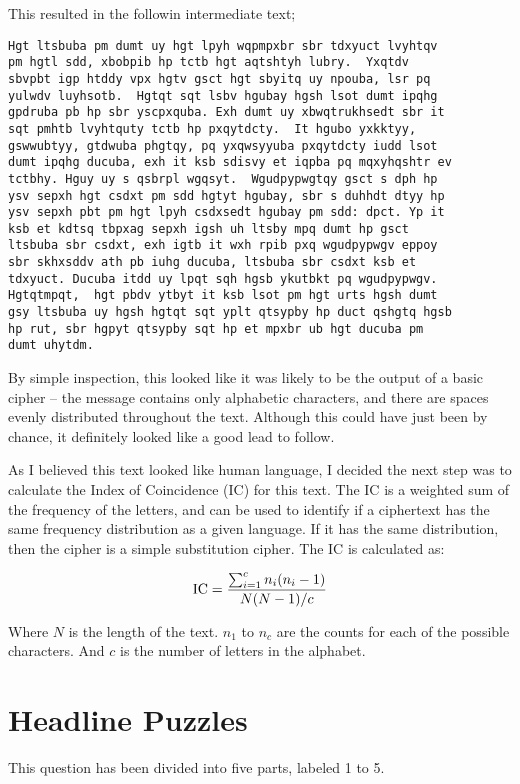 \documentclass[12pt,a4paper,twoside]{article}
\begin{document}
This resulted in the followin intermediate text; 

\begin{lstlisting}
Hgt ltsbuba pm dumt uy hgt lpyh wqpmpxbr sbr tdxyuct lvyhtqv
pm hgtl sdd, xbobpib hp tctb hgt aqtshtyh lubry.  Yxqtdv
sbvpbt igp htddy vpx hgtv gsct hgt sbyitq uy npouba, lsr pq
yulwdv luyhsotb.  Hgtqt sqt lsbv hgubay hgsh lsot dumt ipqhg
gpdruba pb hp sbr yscpxquba. Exh dumt uy xbwqtrukhsedt sbr it
sqt pmhtb lvyhtquty tctb hp pxqytdcty.  It hgubo yxkktyy,
gswwubtyy, gtdwuba phgtqy, pq yxqwsyyuba pxqytdcty iudd lsot
dumt ipqhg ducuba, exh it ksb sdisvy et iqpba pq mqxyhqshtr ev
tctbhy. Hguy uy s qsbrpl wgqsyt.  Wgudpypwgtqy gsct s dph hp
ysv sepxh hgt csdxt pm sdd hgtyt hgubay, sbr s duhhdt dtyy hp
ysv sepxh pbt pm hgt lpyh csdxsedt hgubay pm sdd: dpct. Yp it
ksb et kdtsq tbpxag sepxh igsh uh ltsby mpq dumt hp gsct
ltsbuba sbr csdxt, exh igtb it wxh rpib pxq wgudpypwgv eppoy
sbr skhxsddv ath pb iuhg ducuba, ltsbuba sbr csdxt ksb et
tdxyuct. Ducuba itdd uy lpqt sqh hgsb ykutbkt pq wgudpypwgv.
Hgtqtmpqt,  hgt pbdv ytbyt it ksb lsot pm hgt urts hgsh dumt
gsy ltsbuba uy hgsh hgtqt sqt yplt qtsypby hp duct qshgtq hgsb
hp rut, sbr hgpyt qtsypby sqt hp et mpxbr ub hgt ducuba pm
dumt uhytdm.
\end{lstlisting}

By simple inspection, this looked like it was likely to be the output of a
basic cipher -- the message contains only alphabetic characters, and there are
spaces evenly distributed throughout the text. Although this could have just
been by chance, it definitely looked like a good lead to follow.

As I believed this text looked like human language, I decided the next step was to calculate the Index of Coincidence (IC) for this text. The IC is a weighted sum of the frequency of the letters, and can be used to identify if a ciphertext has the same frequency distribution as a given language. If it has the same distribution, then the cipher is a simple substitution cipher. The IC is calculated as:

$$
\textup{IC} =  \frac{\sum_{i=1}^{c} n_i(n_i -1)}{N(N - 1)/c}
$$

Where $N$ is the length of the text. $n_1$ to $n_c$ are the counts
for each of the possible characters. And $c$ is the number of
letters in the alphabet. 
 
\section{Headline Puzzles}
This question has been divided into five parts, labeled 1 to 5.
\end{document}
